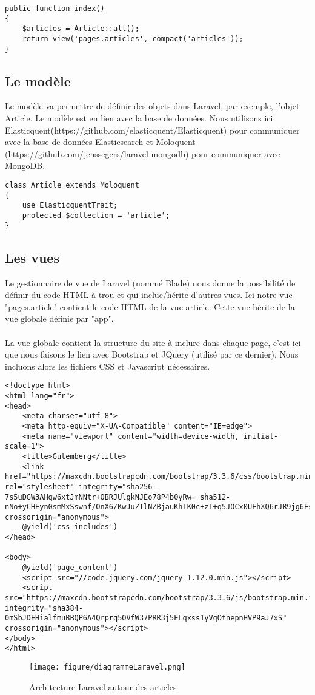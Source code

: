 \begin{verbatim}
public function index()
{
	$articles = Article::all();
	return view('pages.articles', compact('articles'));
}
\end{verbatim}

\subsection{Le modèle}
Le modèle va permettre de définir des objets dans Laravel, par exemple, l'objet Article. Le modèle est en lien avec la base de données. Nous utilisons ici Elasticquent(https://github.com/elasticquent/Elasticquent) pour communiquer avec la base de données Elasticsearch et Moloquent (https://github.com/jenssegers/laravel-mongodb) pour communiquer avec MongoDB.

\begin{verbatim}
class Article extends Moloquent
{
	use ElasticquentTrait;
	protected $collection = 'article';
}
\end{verbatim}

\subsection{Les vues}

Le gestionnaire de vue de Laravel (nommé Blade) nous donne la possibilité de définir du code HTML à trou et qui inclue/hérite d'autres vues. Ici notre vue "pages.article" contient le code HTML de la vue article. Cette vue hérite de la vue globale définie par "app".
\paragraph{}
La vue globale contient la structure du site à inclure dans chaque page, c'est ici que nous faisons le lien avec Bootstrap et JQuery (utilisé par ce dernier). Nous incluons alors les fichiers CSS et Javascript nécessaires.

\begin{verbatim}
<!doctype html>
<html lang="fr">
<head>
	<meta charset="utf-8">
	<meta http-equiv="X-UA-Compatible" content="IE=edge">
	<meta name="viewport" content="width=device-width, initial-scale=1">
	<title>Gutemberg</title>
	<link href="https://maxcdn.bootstrapcdn.com/bootstrap/3.3.6/css/bootstrap.min.css" rel="stylesheet" integrity="sha256-7s5uDGW3AHqw6xtJmNNtr+OBRJUlgkNJEo78P4b0yRw= sha512-nNo+yCHEyn0smMxSswnf/OnX6/KwJuZTlNZBjauKhTK0c+zT+q5JOCx0UFhXQ6rJR9jg6Es8gPuD2uZcYDLqSw==" crossorigin="anonymous">
	@yield('css_includes')
</head>

<body>
	@yield('page_content')
	<script src="//code.jquery.com/jquery-1.12.0.min.js"></script>
	<script src="https://maxcdn.bootstrapcdn.com/bootstrap/3.3.6/js/bootstrap.min.js" integrity="sha384-0mSbJDEHialfmuBBQP6A4Qrprq5OVfW37PRR3j5ELqxss1yVqOtnepnHVP9aJ7xS" crossorigin="anonymous"></script>
</body>
</html>
\end{verbatim}

\begin{figure}[H]
        \centering
        \texttt{[image: figure/diagrammeLaravel.png]}
            \caption{Architecture Laravel autour des articles}
            \label{fig:datajsonPhp}
\end{figure}